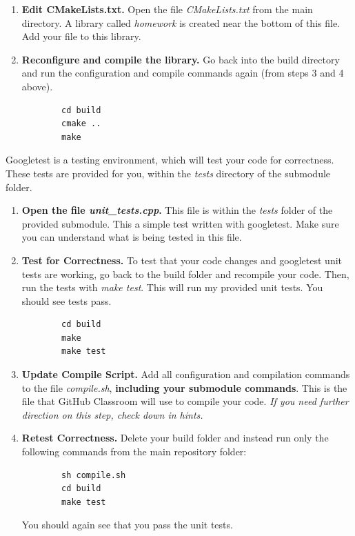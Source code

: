 \documentclass{article} %
\begin{document}
\begin{enumerate}
    \item \textbf{Edit CMakeLists.txt.}  Open the file \emph{CMakeLists.txt} from the main directory.  A library called \emph{homework} is created near the bottom of this file.  Add your file to this library.

    \item \textbf{Reconfigure and compile the library.}  Go back into the build directory and run the configuration and compile commands again (from steps 3 and 4 above).
    \begin{verbatim}
        cd build
        cmake ..
        make
    \end{verbatim}
\end{enumerate}



Googletest is a testing environment, which will test your code for correctness.  These tests are provided for you, within the \emph{tests} directory of the submodule folder.

\begin{enumerate}
    \item \textbf{Open the file \emph{unit\_tests.cpp}.}  This file is within the \emph{tests} folder of the provided submodule.  This a simple test written with googletest.  Make sure you can understand what is being tested in this file.

    \item \textbf{Test for Correctness.}  To test that your code changes and googletest unit tests are working, go back to the build folder and recompile your code.  Then, run the tests with \emph{make test}.  This will run my provided unit tests.  You should see tests pass.
    \begin{verbatim}
        cd build
        make
        make test
    \end{verbatim}
    
    \item \textbf{Update Compile Script.}  Add all configuration and compilation commands to the file \emph{compile.sh}, \textbf{including your submodule commands}.  This is the file that GitHub Classroom will use to compile your code.  \emph{If you need further direction on this step, check down in hints.}

    \item \textbf{Retest Correctness.}  Delete your build folder and instead run only the following commands from the main repository folder:
    \begin{verbatim}
        sh compile.sh
        cd build
        make test
    \end{verbatim}
    You should again see that you pass the unit tests.
\end{enumerate}
\end{document}
